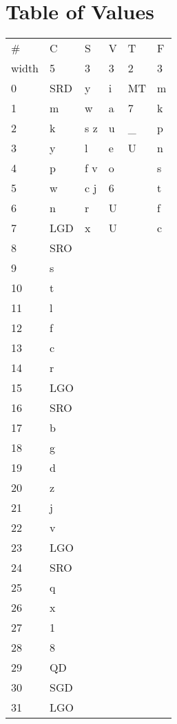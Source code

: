 \documentclass[12pt]{report}
\begin{document}
\section{Table of Values}\label{values}


\begin{tabular}[c]{@{}llllll@{}}
\toprule
\#     & C   & S   & V & T   & F \\
width & 5   & 3   & 3 & 2   & 3 \\
\midrule
0     & SRD & y   & i & MT  & m \\
1     & m   & w   & a & 7   & k \\
2     & k   & s z & u & \_   & p \\
3     & y   & l   & e & U   & n \\
4     & p   & f v & o &     & s \\
5     & w   & c j & 6 &     & t \\
6     & n   & r   & U &     & f \\
7     & LGD & x   & U &     & c \\
8     & SRO &     &   &     &   \\
9     & s   &     &   &     &   \\
10    & t   &     &   &     &   \\
11    & l   &     &   &     &   \\
12    & f   &     &   &     &   \\
13    & c   &     &   &     &   \\
14    & r   &     &   &     &   \\
15    & LGO &     &   &     &   \\
16    & SRO &     &   &     &   \\
17    & b   &     &   &     &   \\
18    & g   &     &   &     &   \\
19    & d   &     &   &     &   \\
20    & z   &     &   &     &   \\
21    & j   &     &   &     &   \\
22    & v   &     &   &     &   \\
23    & LGO &     &   &     &   \\
24    & SRO &     &   &     &   \\
25    & q   &     &   &     &   \\
26    & x   &     &   &     &   \\
27    & 1   &     &   &     &   \\
28    & 8   &     &   &     &   \\
29    & QD  &     &   &     &   \\
30    & SGD &     &   &     &   \\
31    & LGO &     &   &     &   \\
\bottomrule
\end{tabular}
\end{document}
